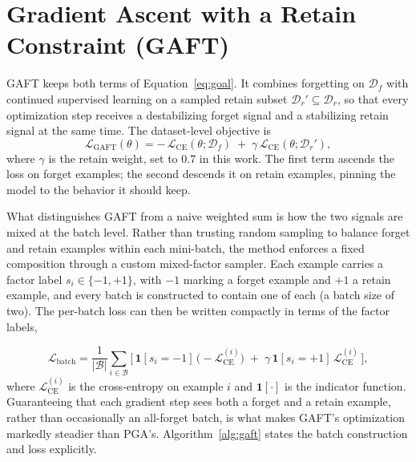 \documentclass[a4paper,12pt]{report}
\begin{document}
\section{Gradient Ascent with a Retain Constraint (GAFT)}
GAFT keeps both terms of Equation~\eqref{eq:goal}. It combines forgetting on $\mathcal{D}_f$ with continued supervised learning on a sampled retain subset $\mathcal{D}_r' \subseteq \mathcal{D}_r$, so that every optimization step receives a destabilizing forget signal and a stabilizing retain signal at the same time. The dataset-level objective is
\begin{equation}
	\mathcal{L}_{\mathrm{GAFT}}(\theta) = -\,\mathcal{L}_{\mathrm{CE}}(\theta; \mathcal{D}_f) \;+\; \gamma\,\mathcal{L}_{\mathrm{CE}}(\theta; \mathcal{D}_r'),
	\label{eq:gaft}
\end{equation}
where $\gamma$ is the retain weight, set to $0.7$ in this work. The first term ascends the loss on forget examples; the second descends it on retain examples, pinning the model to the behavior it should keep.

What distinguishes GAFT from a naive weighted sum is how the two signals are mixed at the batch level. Rather than trusting random sampling to balance forget and retain examples within each mini-batch, the method enforces a fixed composition through a custom mixed-factor sampler. Each example carries a factor label $s_i \in \{-1, +1\}$, with $-1$ marking a forget example and $+1$ a retain example, and every batch is constructed to contain one of each (a batch size of two). The per-batch loss can then be written compactly in terms of the factor labels,

\begin{equation}
	\mathcal{L}_{\mathrm{batch}} = \frac{1}{|\mathcal{B}|}\sum_{i \in \mathcal{B}} \Big[\, \mathbf{1}[s_i = -1]\,\big(-\mathcal{L}_{\mathrm{CE}}^{(i)}\big) \;+\; \gamma\,\mathbf{1}[s_i = +1]\,\mathcal{L}_{\mathrm{CE}}^{(i)} \,\Big],
	\label{eq:gaft-batch}
\end{equation}
where $\mathcal{L}_{\mathrm{CE}}^{(i)}$ is the cross-entropy on example $i$ and $\mathbf{1}[\cdot]$ is the indicator function. Guaranteeing that each gradient step sees both a forget and a retain example, rather than occasionally an all-forget batch, is what makes GAFT's optimization markedly steadier than PGA's. Algorithm~\ref{alg:gaft} states the batch construction and loss explicitly.
\end{document}
